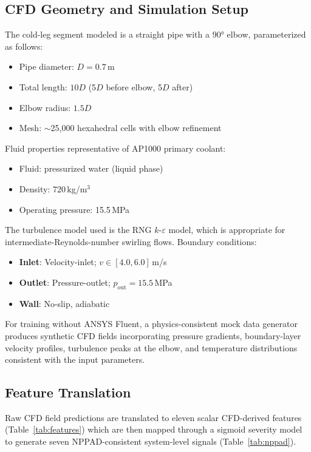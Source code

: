 \documentclass[conference]{IEEEtran}
\begin{document}
\subsection{CFD Geometry and Simulation Setup}

The cold-leg segment modeled is a straight pipe with a 90° elbow, parameterized as follows:
\begin{itemize}
    \item Pipe diameter: $D = 0.7$\,m
    \item Total length: $10D$ (5$D$ before elbow, 5$D$ after)
    \item Elbow radius: $1.5D$
    \item Mesh: $\sim$25,000 hexahedral cells with elbow refinement
\end{itemize}

Fluid properties representative of AP1000 primary coolant:
\begin{itemize}
    \item Fluid: pressurized water (liquid phase)
    \item Density: 720\,kg/m$^3$
    \item Operating pressure: 15.5\,MPa
\end{itemize}

The turbulence model used is the RNG $k$-$\varepsilon$ model, which is appropriate for intermediate-Reynolds-number swirling flows. Boundary conditions:
\begin{itemize}
    \item \textbf{Inlet}: Velocity-inlet; $v \in [4.0, 6.0]$\,m/s
    \item \textbf{Outlet}: Pressure-outlet; $p_\text{out} = 15.5$\,MPa
    \item \textbf{Wall}: No-slip, adiabatic
\end{itemize}

For training without ANSYS Fluent, a physics-consistent mock data generator produces synthetic CFD fields incorporating pressure gradients, boundary-layer velocity profiles, turbulence peaks at the elbow, and temperature distributions consistent with the input parameters.

\subsection{Feature Translation}

Raw CFD field predictions are translated to eleven scalar CFD-derived features (Table~\ref{tab:features}) which are then mapped through a sigmoid severity model to generate seven NPPAD-consistent system-level signals (Table~\ref{tab:nppad}).
\end{document}
